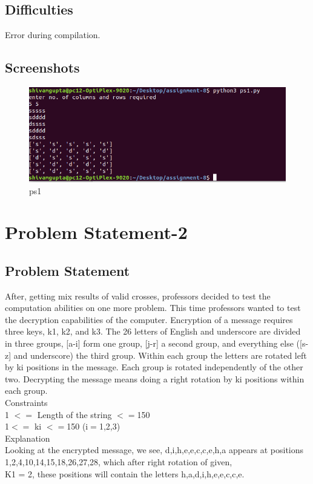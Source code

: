 \documentclass[a4paper,12pt]{article}
\begin{document}
\begin{flushleft}
\subsection{Difficulties}
Error during compilation.
\subsection{Screenshots}
\begin{figure}
\includegraphics[scale=1]{ps1.png}
\caption{ps1}
\end{figure}
\newpage
\section{\large{Problem Statement-2}} 
\subsection{Problem Statement}
\begin{flushleft}
After, getting mix results of valid crosses, professors decided to test the computation abilities on one more problem. This time professors wanted to test the decryption capabilities of the computer.
Encryption of  a message requires three keys, k1, k2, and k3. The 26 letters of English and underscore are divided in three groups,  [a-i] form one group, [j-r] a second group, and everything else ([s-z] and underscore) the third group. Within each group the letters are rotated left by ki positions in the message. Each group is rotated independently of the other two. Decrypting the message means doing a right rotation by ki positions within each group.\\
Constraints\\
1 $<=$ Length of the string $<=$150\\
1$<=$ ki $<=$150 (i$=$1,2,3)\\


Explanation\\

Looking at the encrypted message, we see,
{d,i,h,e,e,c,c,e,h,a} appears at positions {1,2,4,10,14,15,18,26,27,28}, which after right rotation of given,\\
K1 = 2, these positions will contain the letters {h,a,d,i,h,e,e,c,c,e}.\\


\end{flushleft}
\end{flushleft}
\end{document}
